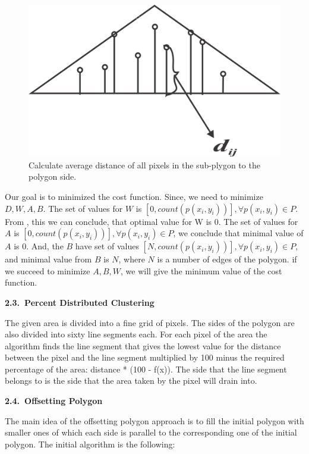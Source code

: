 \documentclass[11pt,leqno]{book}
\newcommand{\subsect}[1]{\vskip 3mm\par{\bf#1}}
\begin{document}
\begin{figure}[h!]
  \centering
  \includegraphics[width=.5\linewidth]{pic06.png}
  \caption{Calculate average distance of all pixels in the sub-plygon to the polygon side.}
\label{fig:four}
\end{figure}
\FloatBarrier

Our goal is to minimized the cost function. Since, we need to minimize $D, W, A, B$. The set of values for $W$ is $[0, count( p(x_i, y_i))], \forall p(x_i, y_i) \in P$. From , this we can conclude, that optimal value for W is 0.
The set of values for $A$ is $[0, count (p(x_i, y_i))], \forall p(x_i, y_i) \in P$, we conclude that minimal value of $A$ is 0. And, the $B$ have set of values $[N,count( p(x_i, y_i))], \forall p(x_i, y_i) \in P$, and minimal value from $B$ is $N$, where $N$ is a number of edges of the polygon.
if we succeed to minimize $A, B, W$, we will give the minimum value of the cost function.

\subsect{2.3.~Percent Distributed Clustering}

The given area is divided into a fine grid of pixels. The sides of the polygon are also divided into sixty line segments each. For each pixel of the area the algorithm finds the line segment that gives the lowest value for the distance between the pixel and the line segment multiplied by 100 minus the required percentage of the area: distance * (100 - f(x)). The side that the line segment belongs to is the side that the area taken by the pixel will drain into.

\subsect{2.4.~Offsetting Polygon}

The main idea of the offsetting polygon approach is to fill the initial polygon with smaller ones of which each side is parallel to the corresponding one of the initial polygon. The initial algorithm is the following:
\end{document}
